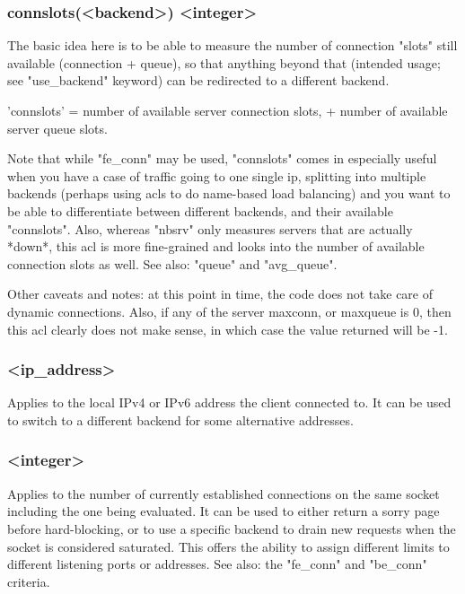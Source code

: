 \subsubsection*{connslots(<backend>) <integer>}
  The basic idea here is to be able to measure the number of connection "slots"
  still available (connection + queue), so that anything beyond that (intended
  usage; see "use\_backend" keyword) can be redirected to a different backend.

  'connslots' = number of available server connection slots, + number of
  available server queue slots.

  Note that while "fe\_conn" may be used, "connslots" comes in especially
  useful when you have a case of traffic going to one single ip, splitting into
  multiple backends (perhaps using acls to do name-based load balancing) and
  you want to be able to differentiate between different backends, and their
  available "connslots".  Also, whereas "nbsrv" only measures servers that are
  actually *down*, this acl is more fine-grained and looks into the number of
  available connection slots as well. See also: "queue" and "avg\_queue".

  \begin{note}{Other caveats and notes:} at this point in time, the code does not take care
  of dynamic connections. Also, if any of the server maxconn, or maxqueue is 0,
  then this acl clearly does not make sense, in which case the value returned
  will be -1.
  \end{note}

\subsubsection[dst]{ <ip\_address>}
  Applies to the local IPv4 or IPv6 address the client connected to. It can be
  used to switch to a different backend for some alternative addresses.

\subsubsection[dst\_conn]{ <integer>}
  Applies to the number of currently established connections on the same socket
  including the one being evaluated. It can be used to either return a sorry
  page before hard-blocking, or to use a specific backend to drain new requests
  when the socket is considered saturated. This offers the ability to assign
  different limits to different listening ports or addresses. See also: the
  "fe\_conn" and "be\_conn" criteria.


